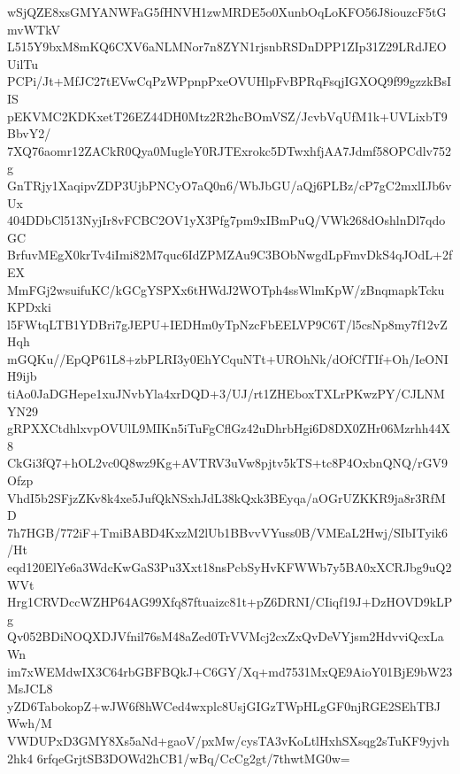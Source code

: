 wSjQZE8xsGMYANWFaG5fHNVH1zwMRDE5o0XunbOqLoKFO56J8iouzcF5tGmvWTkV
L515Y9bxM8mKQ6CXV6aNLMNor7n8ZYN1rjsnbRSDnDPP1ZIp31Z29LRdJEOUilTu
PCPi/Jt+MfJC27tEVwCqPzWPpnpPxeOVUHlpFvBPRqFsqjIGXOQ9f99gzzkBsIIS
pEKVMC2KDKxetT26EZ44DH0Mtz2R2hcBOmVSZ/JcvbVqUfM1k+UVLixbT9BbvY2/
7XQ76aomr12ZACkR0Qya0MugleY0RJTExrokc5DTwxhfjAA7Jdmf58OPCdlv752g
GnTRjy1XaqipvZDP3UjbPNCyO7aQ0n6/WbJbGU/aQj6PLBz/cP7gC2mxlIJb6vUx
404DDbCl513NyjIr8vFCBC2OV1yX3Pfg7pm9xIBmPuQ/VWk268dOshlnDl7qdoGC
BrfuvMEgX0krTv4iImi82M7quc6IdZPMZAu9C3BObNwgdLpFmvDkS4qJOdL+2fEX
MmFGj2wsuifuKC/kGCgYSPXx6tHWdJ2WOTph4ssWlmKpW/zBnqmapkTckuKPDxki
l5FWtqLTB1YDBri7gJEPU+IEDHm0yTpNzcFbEELVP9C6T/l5csNp8my7f12vZHqh
mGQKu//EpQP61L8+zbPLRI3y0EhYCquNTt+UROhNk/dOfCfTIf+Oh/IeONIH9ijb
tiAo0JaDGHepe1xuJNvbYla4xrDQD+3/UJ/rt1ZHEboxTXLrPKwzPY/CJLNMYN29
gRPXXCtdhlxvpOVUlL9MIKn5iTuFgCflGz42uDhrbHgi6D8DX0ZHr06Mzrhh44X8
CkGi3fQ7+hOL2vc0Q8wz9Kg+AVTRV3uVw8pjtv5kTS+tc8P4OxbnQNQ/rGV9Ofzp
VhdI5b2SFjzZKv8k4xe5JufQkNSxhJdL38kQxk3BEyqa/aOGrUZKKR9ja8r3RfMD
7h7HGB/772iF+TmiBABD4KxzM2lUb1BBvvVYuss0B/VMEaL2Hwj/SIbITyik6/Ht
eqd120ElYe6a3WdcKwGaS3Pu3Xxt18nsPcbSyHvKFWWb7y5BA0xXCRJbg9uQ2WVt
Hrg1CRVDccWZHP64AG99Xfq87ftuaizc81t+pZ6DRNI/CIiqf19J+DzHOVD9kLPg
Qv052BDiNOQXDJVfnil76sM48aZed0TrVVMcj2cxZxQvDeVYjsm2HdvviQcxLaWn
im7xWEMdwIX3C64rbGBFBQkJ+C6GY/Xq+md7531MxQE9AioY01BjE9bW23MsJCL8
yZD6TabokopZ+wJW6f8hWCed4wxplc8UsjGIGzTWpHLgGF0njRGE2SEhTBJWwh/M
VWDUPxD3GMY8Xs5aNd+gaoV/pxMw/cysTA3vKoLtlHxhSXsqg2sTuKF9yjvh2hk4
6rfqeGrjtSB3DOWd2hCB1/wBq/CcCg2gt/7thwtMG0w=
